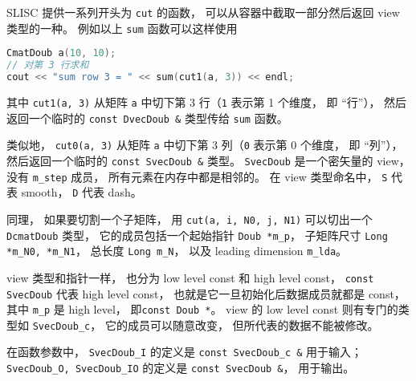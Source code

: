 SLISC 提供一系列开头为 \verb|cut| 的函数， 可以从容器中截取一部分然后返回 view 类型的一种。 例如以上 \verb|sum| 函数可以这样使用
\begin{lstlisting}[language=cpp]
CmatDoub a(10, 10);
// 对第 3 行求和
cout << "sum row 3 = " << sum(cut1(a, 3)) << endl;
\end{lstlisting}
其中 \verb|cut1(a, 3)| 从矩阵 \verb|a| 中切下第 3 行（\verb|1| 表示第 1 个维度， 即 “行”）， 然后返回一个临时的 \verb|const DvecDoub &| 类型传给 \verb|sum| 函数。

类似地， \verb|cut0(a, 3)| 从矩阵 \verb|a| 中切下第 3 列（\verb|0| 表示第 0 个维度， 即 “列”）， 然后返回一个临时的 \verb|const SvecDoub &| 类型。 \verb|SvecDoub| 是一个密矢量的 view， 没有 \verb|m_step| 成员， 所有元素在内存中都是相邻的。 在 view 类型命名中， \verb|S| 代表 smooth， \verb|D| 代表 dash。

同理， 如果要切割一个子矩阵， 用 \verb|cut(a, i, N0, j, N1)| 可以切出一个 \verb|DcmatDoub| 类型， 它的成员包括一个起始指针 \verb|Doub *m_p|， 子矩阵尺寸 \verb|Long *m_N0, *m_N1|， 总长度 \verb|Long m_N|， 以及 leading dimension \verb|m_lda|。

view 类型和指针一样， 也分为 low level const 和 high level const， \verb|const SvecDoub| 代表 high level const， 也就是它一旦初始化后数据成员就都是 const， 其中 \verb|m_p| 是 high level， 即\verb|const Doub *|。 view 的 low level const 则有专门的类型如 \verb|SvecDoub_c|， 它的成员可以随意改变， 但所代表的数据不能被修改。

在函数参数中， \verb|SvecDoub_I| 的定义是 \verb|const SvecDoub_c &| 用于输入； \verb|SvecDoub_O, SvecDoub_IO| 的定义是 \verb|const SvecDoub &|， 用于输出。

